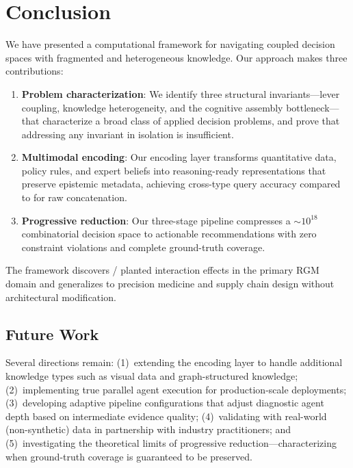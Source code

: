 \section{Conclusion}
\label{sec:conclusion}

We have presented a computational framework for navigating coupled decision spaces with fragmented and heterogeneous knowledge.
Our approach makes three contributions:

\begin{enumerate}
    \item \textbf{Problem characterization}: We identify three structural invariants---lever coupling, knowledge heterogeneity, and the cognitive assembly bottleneck---that characterize a broad class of applied decision problems, and prove that addressing any invariant in isolation is insufficient.

    \item \textbf{Multimodal encoding}: Our encoding layer transforms quantitative data, policy rules, and expert beliefs into reasoning-ready representations that preserve epistemic metadata, achieving \CROSSTYPEACCURACY{} cross-type query accuracy compared to \RAWCONCATACCURACY{} for raw concatenation.

    \item \textbf{Progressive reduction}: Our three-stage pipeline compresses a ${\sim}10^{18}$ combinatorial decision space to \PIPELINEOUTPUT{} actionable recommendations with zero constraint violations and complete ground-truth coverage.
\end{enumerate}

The framework discovers \EFFECTSDISCOVERED{}/\EFFECTSTOTAL{} planted interaction effects in the primary RGM domain and generalizes to precision medicine and supply chain design without architectural modification.

\subsection{Future Work}

Several directions remain:
(1)~extending the encoding layer to handle additional knowledge types such as visual data and graph-structured knowledge;
(2)~implementing true parallel agent execution for production-scale deployments;
(3)~developing adaptive pipeline configurations that adjust diagnostic agent depth based on intermediate evidence quality;
(4)~validating with real-world (non-synthetic) data in partnership with industry practitioners;
and (5)~investigating the theoretical limits of progressive reduction---characterizing when ground-truth coverage is guaranteed to be preserved.

